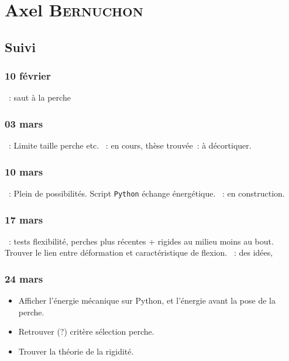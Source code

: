 \documentclass[a4paper, 11pt, final, garamond]{book}
\begin{document}
\chapter{Axel \textsc{Bernuchon}}
\label{ch:axel}
\section{Suivi}
\subsection{10 février}
\begin{itemize}
    ~: saut à la perche
\end{itemize}

\subsection{03 mars}
\begin{itemize}
    ~: Limite taille perche etc.
    ~: en cours, thèse trouvée~: à décortiquer.
\end{itemize}

\subsection{10 mars}
\begin{itemize}
    ~: Plein de possibilités. Script \texttt{Python} échange
        énergétique.
    ~: en construction.
\end{itemize}

\subsection{17 mars}
\begin{itemize}
    ~: tests flexibilité, perches plus récentes + rigides au milieu
        moins au bout. Trouver le lien entre déformation et caractéristique de
        flexion.
    ~: des idées,
\end{itemize}

\subsection{24 mars}
\begin{itemize}
    ~:
        \begin{enumerate}[label=\Roman*]
            \item Énergie théorique et expérimentale avec Python
            \item Rigidité (énergétique aussi)~: constante de rigidité~?
        \end{enumerate}
    \item Afficher l'énergie mécanique sur Python, et l'énergie avant la pose de
        la perche.
    \item Retrouver (?) critère sélection perche.
    \item Trouver la théorie de la rigidité.
\end{itemize}
\end{document}
